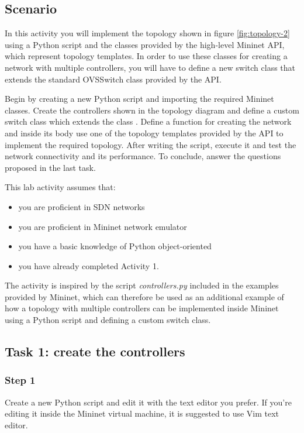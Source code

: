 \subsection*{Scenario}
In this activity you will implement the topology shown in figure \ref{fig:topology-2} using
a Python script and the classes provided by the high-level Mininet API, which
represent topology templates. In order to use these classes for creating a network
with multiple controllers, you will have to define a new switch class that extends
the standard OVSSwitch class provided by the API.

Begin by creating a new Python script and importing the required Mininet classes.
Create the controllers shown in the topology diagram and define
a custom switch class which extends the class . Define a function for creating
the network and inside its body use one of the topology templates provided
by the API to implement the required topology.
After writing the script, execute it and test the network connectivity and its
performance. To conclude, answer the questions proposed in the last task.

This lab activity assumes that:
\begin{itemize}
  \item you are proficient in SDN networks
  \item you are proficient in Mininet network emulator
  \item you have a basic knowledge of Python object-oriented
  \item you have already completed Activity 1.
\end{itemize}

The activity is inspired by the script \textit{controllers.py} \cite{ref-6} included in the
examples provided by Mininet, which can therefore be used as
an additional example of how a topology with multiple controllers can be implemented
inside Mininet using a Python script and defining a custom switch class.





\subsection*{Task 1: create the controllers}
\subsubsection*{Step 1}
Create a new Python script and edit it with the text editor you prefer. If you're editing
it inside the Mininet virtual machine, it is suggested to use Vim text editor.

